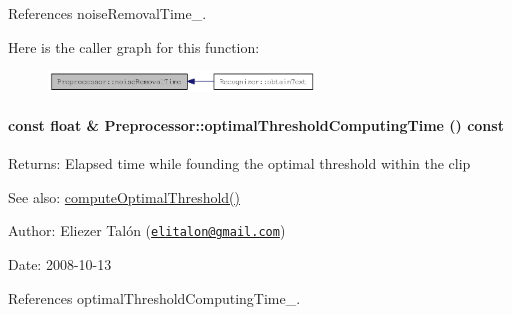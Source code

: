 References noiseRemovalTime\_\-.

Here is the caller graph for this function:\nopagebreak
\begin{figure}[H]
\begin{center}
\leavevmode
\includegraphics[width=201pt]{class_preprocessor_ff8eee937760e42c0c2bea307849ada1_icgraph}
\end{center}
\end{figure}
\hypertarget{class_preprocessor_72aa2eb5f3a7e7ee0d3ca27ddd6bfc5e}{
\paragraph[optimalThresholdComputingTime]{\setlength{\rightskip}{0pt plus 5cm}const float \& Preprocessor::optimalThresholdComputingTime () const}\hfill}
\label{class_preprocessor_72aa2eb5f3a7e7ee0d3ca27ddd6bfc5e}


\begin{Desc}
\item[Returns:]Elapsed time while founding the optimal threshold within the clip\end{Desc}
\begin{Desc}
\item[See also:]\hyperlink{class_preprocessor_ac2f414d6f4f917419f33f6067eb8634}{computeOptimalThreshold()}\end{Desc}
\begin{Desc}
\item[Author:]Eliezer Talón (\href{mailto:elitalon@gmail.com}{\tt elitalon@gmail.com}) \end{Desc}
\begin{Desc}
\item[Date:]2008-10-13 \end{Desc}


References optimalThresholdComputingTime\_\-.


